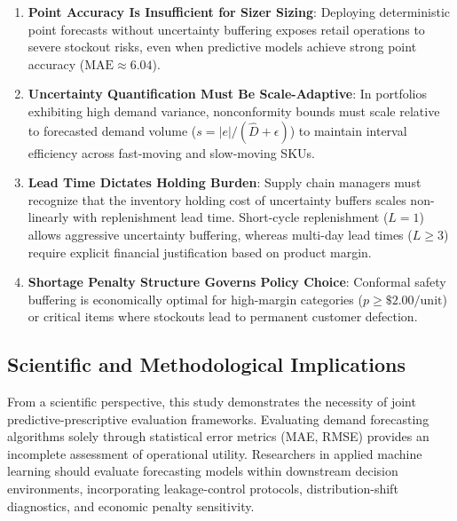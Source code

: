 \begin{enumerate}
    \item \textbf{Point Accuracy Is Insufficient for Sizer Sizing}: Deploying deterministic point forecasts without uncertainty buffering exposes retail operations to severe stockout risks, even when predictive models achieve strong point accuracy ($\text{MAE} \approx 6.04$).
    \item \textbf{Uncertainty Quantification Must Be Scale-Adaptive}: In portfolios exhibiting high demand variance, nonconformity bounds must scale relative to forecasted demand volume ($s = |e| / (\hat{D} + \epsilon)$) to maintain interval efficiency across fast-moving and slow-moving SKUs.
    \item \textbf{Lead Time Dictates Holding Burden}: Supply chain managers must recognize that the inventory holding cost of uncertainty buffers scales non-linearly with replenishment lead time. Short-cycle replenishment ($L=1$) allows aggressive uncertainty buffering, whereas multi-day lead times ($L \ge 3$) require explicit financial justification based on product margin.
    \item \textbf{Shortage Penalty Structure Governs Policy Choice}: Conformal safety buffering is economically optimal for high-margin categories ($p \ge \$2.00/\text{unit}$) or critical items where stockouts lead to permanent customer defection.
\end{enumerate}

\subsection{Scientific and Methodological Implications}
From a scientific perspective, this study demonstrates the necessity of joint predictive-prescriptive evaluation frameworks. Evaluating demand forecasting algorithms solely through statistical error metrics (MAE, RMSE) provides an incomplete assessment of operational utility. Researchers in applied machine learning should evaluate forecasting models within downstream decision environments, incorporating leakage-control protocols, distribution-shift diagnostics, and economic penalty sensitivity.

